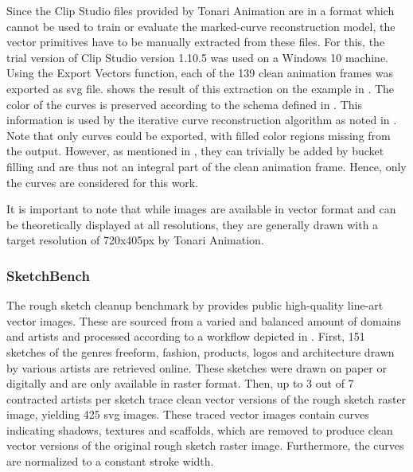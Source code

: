 Since the Clip Studio files provided by Tonari Animation are in a format which cannot be used to train or evaluate the marked-curve reconstruction model, the vector primitives have to be manually extracted from these files. For this, the trial version of Clip Studio version 1.10.5  \citep{clipstudio} was used on a Windows 10 machine. Using the Export Vectors function, each of the 139 clean animation frames was exported as \gls{svg} file.  shows the result of this extraction on the example in . The color of the curves is preserved according to the schema defined in . This information is used by the iterative curve reconstruction algorithm as noted in . Note that only curves could be exported, with filled color regions missing from the output. However, as mentioned in , they can trivially be added by bucket filling and are thus not an integral part of the clean animation frame. Hence, only the curves are considered for this work.

It is important to note that while images are available in vector format and can be theoretically displayed at all resolutions, they are generally drawn with a target resolution of 720x405px by Tonari Animation.

\subsubsection{SketchBench}
\label{subsec:dataset.sketchbench}

The rough sketch cleanup benchmark by \citep{Yan:2020:ABR} provides public high-quality line-art vector images. These are sourced from a varied and balanced amount of domains and artists and processed according to a workflow depicted in . First, 151 sketches of the genres freeform, fashion, products, logos and architecture drawn by various artists are retrieved online. These sketches were drawn on paper or digitally and are only available in raster format. Then, up to 3 out of 7 contracted artists per sketch trace clean vector versions of the rough sketch raster image, yielding 425 \gls{svg} images. These traced vector images contain curves indicating shadows, textures and scaffolds, which are removed to produce clean vector versions of the original rough sketch raster image. Furthermore, the curves are normalized to a constant stroke width.

